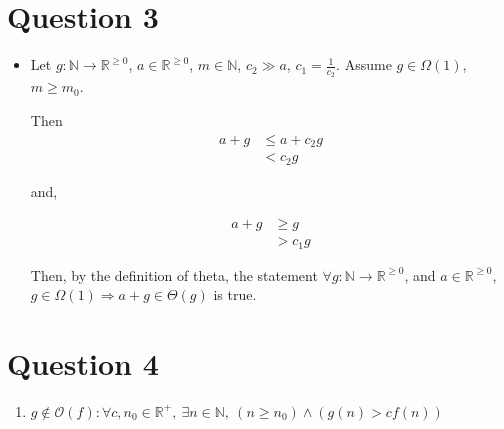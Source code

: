 \documentclass[12pt]{article}
\begin{document}
\section*{Question 3}
\begin{itemize}
    \item

    Let $g: \mathbb{N} \to \mathbb{R}^{\geq 0}$, $a \in \mathbb{R}^{\geq 0}$,
    $m \in \mathbb{N}$, $c_2 \gg a$, $c_1 = \frac{1}{c_2}$. Assume $g \in \Omega (1)$,
    $m \geq m_0$.

    \bigskip

    Then
    \setcounter{equation}{0}
    \begin{align}
        a + g &\leq a + c_2 g\\
        &< c_2 g
    \end{align}

    and,

    \begin{align}
        a + g &\geq g\\
        &> c_1 g
    \end{align}

    \bigskip

    Then, by the definition of theta, the statement $\forall g: \mathbb{N} \to
    \mathbb{R}^{\geq 0}$, and $a \in \mathbb{R}^{\geq 0}$, $g \in \Omega(1)
    \Rightarrow a + g \in \Theta(g)$ is true.

\end{itemize}

\section*{Question 4}
\begin{enumerate}
    \item

    $g \notin \mathcal{O}(f): \forall c,n_0 \in \mathbb{R}^{+},\:\exists n \in \mathbb{N},\:(
    n \geq n_0) \land (g(n) > cf(n))$

\end{enumerate}
\end{document}
